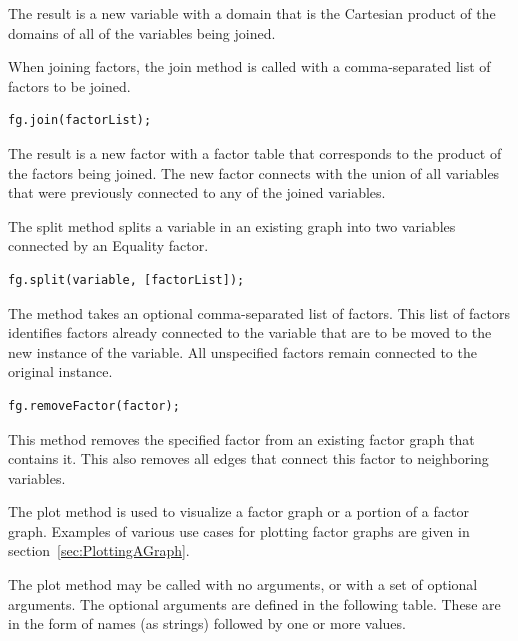 The result is a new variable with a domain that is the Cartesian product of the domains of all of the variables being joined.

When joining factors, the join method is called with a comma-separated list of factors to be joined.

\begin{lstlisting}
fg.join(factorList);
\end{lstlisting}

The result is a new factor with a factor table that corresponds to the product of the factors being joined.  The new factor connects with the union of all variables that were previously connected to any of the joined variables.



The split method splits a variable in an existing graph into two variables connected by an Equality factor.

\begin{lstlisting}
fg.split(variable, [factorList]);
\end{lstlisting}

The method takes an optional comma-separated list of factors.  This list of factors identifies factors already connected to the variable that are to be moved to the new instance of the variable.  All unspecified factors remain connected to the original instance.


\begin{lstlisting}
fg.removeFactor(factor);
\end{lstlisting}

This method removes the specified factor from an existing factor graph that contains it.  This also removes all edges that connect this factor to neighboring variables.

\ifmatlab
{}

The plot method is used to visualize a factor graph or a portion of a factor graph.  Examples of various use cases for plotting factor graphs are given in section~\ref{sec:PlottingAGraph}.

The plot method may be called with no arguments, or with a set of optional arguments.  The optional arguments are defined in the following table.  These are in the form of names (as strings) followed by one or more values.


